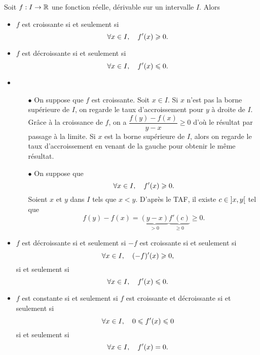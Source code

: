 \documentclass{magnoliaold}
\begin{document}
\begin{proposition}[utile=-3]
Soit $f:I\to\mathbb{R}$ une fonction réelle, dérivable sur un intervalle $I$. Alors
\begin{itemize}
\item $f$ est croissante si et seulement si
  \[\forall x\in I ,\quad f'(x)\geqslant 0.\]
\item $f$ est décroissante si et seulement si
  \[\forall x\in I ,\quad f'(x)\leqslant 0.\]
\end{itemize}
\end{proposition}

\begin{preuve}
\begin{itemize}
\item 
\begin{itemize}
\item[$\bullet$] On suppose que $f$ est croissante. Soit $x\in I$. Si $x$ n'est pas la borne supérieure de $I$, on regarde le taux d'accroissement pour $y$ à droite de $I$. Grâce à la croissance de $f$, on a $\dfrac{f(y)-f(x)}{y-x}\geq 0$ d'où le résultat par passage à la limite.
Si $x$ est la borne supérieure de $I$, alors on regarde le taux d'accroissement en venant de la gauche pour obtenir le même résultat.
\item[$\bullet$] On suppose que 
  \[\forall x\in I ,\quad f'(x)\geqslant 0.\]
  Soient $x$ et $y$ dans $I$ tels que $x<y$. D'après le TAF, il existe $c\in \left]x,y\right[$ tel que $$f(y)-f(x)=\underbrace{(y-x)}_{>0}\underbrace{f'(c)}_{\geq 0}\geq 0.$$
\end{itemize}
\item $f$ est décroissante si et seulement si $-f$ est croissante si et seulement si \[\forall x\in I ,\quad (-f)'(x)\geqslant 0,\] si et seulement si
  \[\forall x\in I ,\quad f'(x)\leqslant 0.\]
\item $f$ est constante si et seulement si $f$ est croissante et décroissante si et seulement si \[\forall x\in I ,\quad 0\leqslant f'(x)\leqslant 0\] si et seulement si
  \[\forall x\in I ,\quad f'(x)=0.\]
\end{itemize}
\end{preuve}
\end{document}
